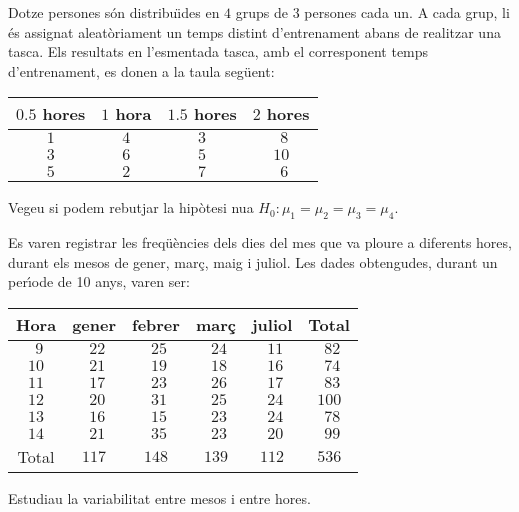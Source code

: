 \begin{prob}
{Dotze persones s\'on distribu\"{\i}des en $4$
grups de $3$ persones cada un. A cada grup, li \'es
assignat aleat\`oriament un temps distint d'entrenament
abans de realitzar una tasca. Els resultats en
l'esmentada tasca, amb el corresponent temps
d'entrenament, es donen a la taula seg\"uent:
\newpage
\begin{center}
\begin{tabular}{|c|c|c|c|}
\hline
$0.5$ hores&$1$ hora&$1.5$ hores&$2$ hores\\\hline\hline
$1$&$4$&$3$&$\ \,8$\\\hline
$3$&$6$&$5$&$10$\\\hline
$5$&$2$&$7$&$\ \,6$\\\hline
\end{tabular}
\end{center}
Vegeu si podem rebutjar la
hip\`otesi nu{\lgem}a $H_0:\mu_1=\mu_2=\mu_3=\mu_4.$}
\end{prob}

\begin{prob}
{Es varen registrar les
freq\"u\`encies dels dies del mes que va ploure a
diferents hores, durant els mesos de gener, mar\c{c}, maig
i juliol. Les dades obtengudes, durant un per\'{\i}ode de
10 anys, varen ser:
\begin{center}
\begin{tabular}{|c||c|c|c|c||c|}
\hline
Hora&gener&febrer&mar\c{c}&juliol&Total\\\hline\hline
$\ \,9$&$\ \,22$&$\ \,25$&$\ \,24$&$\ \,11$&$\ \,82$\\\hline
$10$&$\ \,21$&$\ \,19$&$\ \,18$&$\ \,16$&$\ \,74$\\\hline
$11$&$\ \,17$&$\ \,23$&$\ \,26$&$\ \,17$&$\ \,83$\\\hline
$12$&$\ \,20$&$\ \,31$&$\ \,25$&$\ \,24$&$100$\\\hline
$13$&$\ \,16$&$\ \,15$&$\ \,23$&$\ \,24$&$\ \,78$\\\hline
$14$&$\ \,21$&$\ \,35$&$\ \,23$&$\ \,20$&$\ \,99$\\\hline\hline
Total&$117$&$148$&$139$&$112$&$536$\\\hline
\end{tabular}
\end{center}
Estudiau la variabilitat entre mesos i entre hores.
}
\end{prob}

